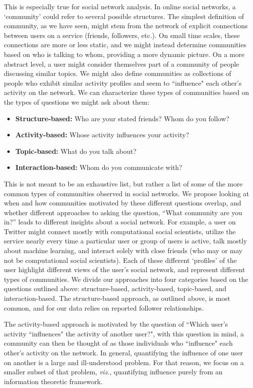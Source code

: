 This is especially true for social network analysis. In online social networks, a `community' could refer to several possible structures. The simplest definition of community, as we have seen, might stem from the network of explicit connections between users on a service (friends, followers, etc.). On small time scales, these connections are more or less static, and we might instead determine communities based on who is talking to whom, providing a more dynamic picture. On a more abstract level, a user might consider themselves part of a community of people discussing similar topics. We might also define communities as collections of people who exhibit similar activity profiles and seem to ``influence" each other's activity on the network. We can characterize these types of communities based on the types of questions we might ask about them:
\begin{itemize}
	\item \textbf{Structure-based:} Who are your stated friends? Whom do you follow?
	\item \textbf{Activity-based:} Whose activity influences your activity?
	\item \textbf{Topic-based:} What do you talk about?
	\item \textbf{Interaction-based:} Whom do you communicate with?
\end{itemize}

This is not meant to be an exhaustive list, but rather a list of some of the more common types of communities observed in social networks. We propose looking at when and how communities motivated by these different questions overlap, and whether different approaches to asking the question, ``What community are you in?'' leads to different insights about a social network. For example, a user on Twitter might connect mostly with computational social scientists, utilize the service nearly every time a particular user or group of users is active, talk mostly about machine learning, and interact solely with close friends (who may or may not be computational social scientists). Each of these different `profiles' of the user highlight different views of the user's social network, and represent different types of communities. We divide our approaches into four categories based on the questions outlined above: structure-based, activity-based, topic-based, and interaction-based. The structure-based approach, as outlined above, is most common, and for our data relies on reported follower relationships.

The activity-based approach is motivated by the question of ``Which user's activity ``influences" the activity of another user?", %
 with this question in mind, a community can then be thought of as those individuals who ``influence" each other's activity on the network. In general, quantifying the influence of one user on another is a large and ill-understood problem. For that reason, we focus on a smaller subset of that problem, \emph{viz.}, quantifying influence purely from an information theoretic framework.

